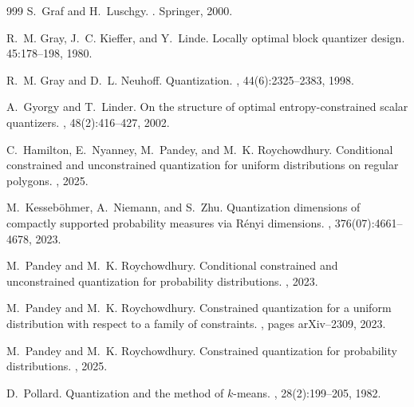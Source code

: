 \documentclass[12pt, reqno]{amsart}
\theoremstyle{plain}
\theoremstyle{definition}
\begin{document}
\begin{thebibliography}{999}
S.~Graf and H.~Luschgy.
.
\newblock Springer, 2000.

R.~M. Gray, J.~C. Kieffer, and Y.~Linde.
\newblock Locally optimal block quantizer design.
 45:178--198, 1980.

R.~M. Gray and D.~L. Neuhoff.
\newblock Quantization.
, 44(6):2325--2383,
  1998.

A.~Gyorgy and T.~Linder.
\newblock On the structure of optimal entropy-constrained scalar quantizers.
, 48(2):416--427, 2002.

C.~Hamilton, E.~Nyanney, M.~Pandey, and M.~K. Roychowdhury.
\newblock Conditional constrained and unconstrained quantization for uniform
  distributions on regular polygons.
, 2025.

M.~Kesseb{\"o}hmer, A.~Niemann, and S.~Zhu.
\newblock Quantization dimensions of compactly supported probability measures
  via {R}{\'e}nyi dimensions.
,
  376(07):4661--4678, 2023.

M.~Pandey and M.~K. Roychowdhury.
\newblock Conditional constrained and unconstrained quantization for
  probability distributions.
, 2023.

M.~Pandey and M.~K. Roychowdhury.
\newblock Constrained quantization for a uniform distribution with respect to a
  family of constraints.
, pages arXiv--2309, 2023.

%

M.~Pandey and M.~K. Roychowdhury.
\newblock Constrained quantization for probability distributions.
, 2025.

D.~Pollard.
\newblock Quantization and the method of $k$-means.
, 28(2):199--205, 1982.


\end{thebibliography}
\end{document}
